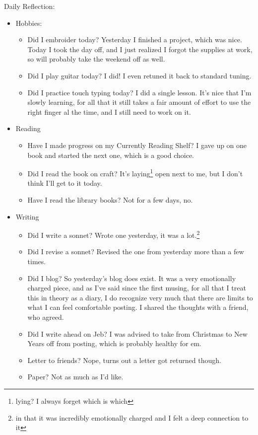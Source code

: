 \documentclass[12pt]{article}[titlepage]
\newcommand{\1}{\={a}}
\newcommand{\2}{\={e}}
\newcommand{\3}{\={\i}}
\newcommand{\4}{\=o}
\newcommand{\5}{\=u}
\newcommand{\6}{\={A}}
\renewcommand{\,}{\textsuperscript{,}}
\begin{document}
Daily Reflection:
\begin{itemize}
\item Hobbies:
\begin{itemize}
\item Did I embroider today? Yesterday I finished a project, which was nice. Today I took the day off, and I just realized I forgot the supplies at work, so will probably take the weekend off as well.
\item Did I play guitar today? I did! I even retuned it back to standard tuning.
\item Did I practice touch typing today? I did a single lesson. It's nice that I'm slowly learning, for all that it still takes a fair amount of effort to use the right finger al the time, and I still need to work on it.
\end{itemize}
\item Reading
\begin{itemize}
\item Have I made progress on my Currently Reading Shelf? I gave up on one book and started the next one, which is a good choice.
\item Did I read the book on craft? It's laying\footnote{lying? I always forget which is which} open next to me, but I don't think I'll get to it today.
\item Have I read the library books? Not for a few days, no.
\end{itemize}
\item Writing
\begin{itemize}
\item Did I write a sonnet? Wrote one yesterday, it was a lot.\footnote{in that it was incredibly emotionally charged and I felt a deep connection to it}
\item Did I revise a sonnet? Revised the one from yesterday more than a few times.
\item Did I blog? So yesterday's blog does exist. It was a very emotionally charged piece, and as I've said since the first musing, for all that I treat this in theory as a diary, I do recognize very much that there are limits to what I can feel comfortable posting. I shared the thoughts with a friend, who agreed.
\item Did I write ahead on Jeb? I was advised to take from Christmas to New Years off from posting, which is probably healthy for em.
\item Letter to friends? Nope, turns out a letter got returned though.
\item Paper? Not as much as I'd like.

\end{itemize}
\end{itemize}
\end{document}

